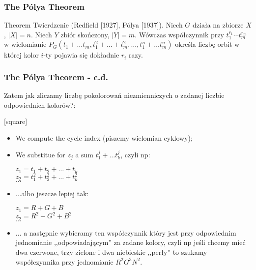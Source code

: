 \documentclass[a4paper, 11pt, xcolor=dvipsnames]{beamer}
\begin{document}
\begin{frame}\frametitle{The P\'{o}lya Theorem}
  \begin{block}{Theorem}
  Twierdzenie (Redfield [1927], P\'{o}lya [1937]). Niech $G$ działa na zbiorze
  $X$, $|X| = n$. Niech $Y$ zbiór skończony, $|Y| = m$.
  Wówczas współczynnik przy $t_1^{r_1} \cdots t_m^{r_m}$
  w wielomianie $P_G(t_1 + \ldots t_m, t_1^2 + \ldots + t_m^2, \ldots,
  t_1^n + \ldots t_m^n)$
  określa liczbę orbit w której kolor $i$-ty pojawia się dokładnie $r_i$ razy.
  \end{block}
\end{frame}


\begin{frame}\frametitle{The P\'{o}lya Theorem - c.d.}
  Zatem jak zliczamy liczbę pokolorowań niezmienniczych
  o zadanej liczbie odpowiednich kolorów?:

[square] %
\begin{itemize}
\item<1->
  We compute the cycle index (piszemy wielomian cyklowy);
\item<2->
  We substitue for $z_j$ a sum $t_1^j + \ldots t_k^j$,
  czyli np:
  \begin{tabbing}
    $z_1 = t_1 + t_2 + \ldots + t_k$ \\
    $z_2 = t_1^2 + t_2^2 + \ldots + t_k^2$\\
    $\ldots$
  \end{tabbing}
\item<3-> ...albo jeszcze lepiej tak:
  \begin{tabbing}
    $z_1 = R + G + B$ \\
    $z_2 = R^2 + G^2 + B^2$\\
    $\ldots$ %
  \end{tabbing}
\item<4-> ... a następnie wybieramy ten współczynnik który
  jest przy odpowiednim jednomianie ,,odpowiadającym'' za zadane
  kolory, czyli np jeśli chcemy mieć dwa czerwone, trzy zielone i dwa niebieskie
  ,,perły'' to szukamy współczynnika przy jednomianie $R^2 G^3 N^2$.
\end{itemize}
\end{frame}
\end{document}
